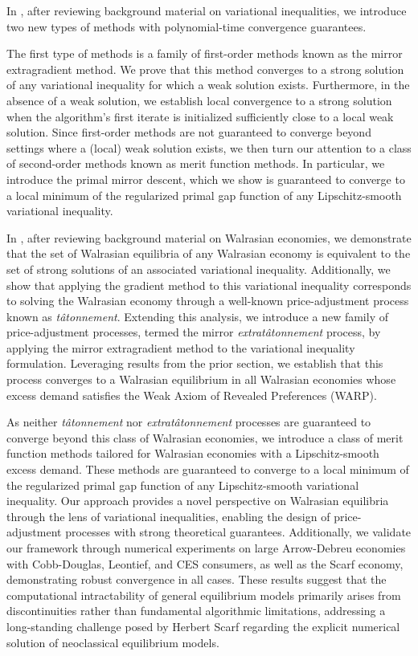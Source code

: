 In , after reviewing background material on variational inequalities, we introduce two new types of methods with polynomial-time convergence guarantees.

The first type of methods is a family of first-order methods known as the mirror extragradient method. We prove that this method converges to a strong solution of any variational inequality for which a weak solution exists. Furthermore, in the absence of a weak solution, we establish local convergence to a strong solution when the algorithm’s first iterate is initialized sufficiently close to a local weak solution. Since first-order methods are not guaranteed to converge beyond settings where a (local) weak solution exists, we then turn our attention to a class of second-order methods known as merit function methods. In particular, we introduce the primal mirror descent, which we show is guaranteed to converge to a local minimum of the regularized primal gap function of any Lipschitz-smooth variational inequality.

In , after reviewing background material on Walrasian economies, we demonstrate that the set of Walrasian equilibria of any Walrasian economy is equivalent to the set of strong solutions of an associated variational inequality. Additionally, we show that applying the gradient method to this variational inequality corresponds to solving the Walrasian economy through a well-known price-adjustment process known as \emph{tâtonnement}. Extending this analysis, we introduce a new family of price-adjustment processes, termed the mirror \emph{extratâtonnement} process, by applying the mirror extragradient method to the variational inequality formulation. Leveraging results from the prior section, we establish that this process converges to a Walrasian equilibrium in all Walrasian economies whose excess demand satisfies the Weak Axiom of Revealed Preferences (WARP).

As neither \emph{tâtonnement} nor \emph{extratâtonnement} processes are guaranteed to converge beyond this class of Walrasian economies, we introduce a class of merit function methods tailored for Walrasian economies with a Lipschitz-smooth excess demand. These methods are guaranteed to converge to a local minimum of the regularized primal gap function of any Lipschitz-smooth variational inequality. Our approach provides a novel perspective on Walrasian equilibria through the lens of variational inequalities, enabling the design of price-adjustment processes with strong theoretical guarantees. Additionally, we validate our framework through numerical experiments on large Arrow-Debreu economies with Cobb-Douglas, Leontief, and CES consumers, as well as the Scarf economy, demonstrating robust convergence in all cases. These results suggest that the computational intractability of general equilibrium models primarily arises from discontinuities rather than fundamental algorithmic limitations, addressing a long-standing challenge posed by Herbert Scarf regarding the explicit numerical solution of neoclassical equilibrium models.

\fi